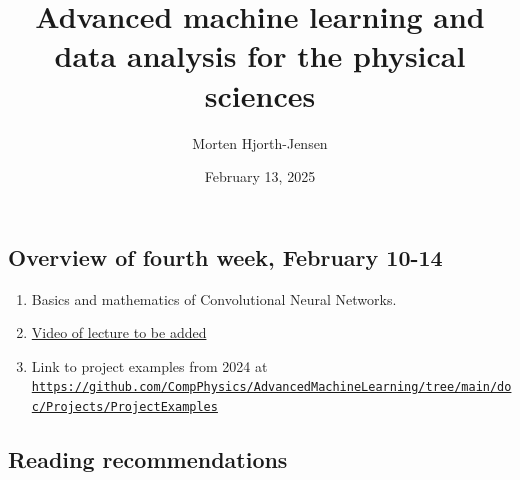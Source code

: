 \documentclass[%
oneside,                 %
final,                   %
10pt]{article}
\begin{document}

\newcommand{\exercisesection}[1]{\subsection*{#1}}






\title{Advanced machine learning and data analysis for the physical sciences}


\author{Morten Hjorth-Jensen}

\date{February 13, 2025
}

\subsection{Overview of fourth  week, February 10-14}

\begin{block}{}
\begin{enumerate}
\item Basics and mathematics of Convolutional  Neural Networks.

\item \href{{https://youtu.be/}}{Video of lecture to be added}

\item Link to project examples from 2024 at \href{{https://github.com/CompPhysics/AdvancedMachineLearning/tree/main/doc/Projects/ProjectExamples}}{\nolinkurl{https://github.com/CompPhysics/AdvancedMachineLearning/tree/main/doc/Projects/ProjectExamples}}
\end{enumerate}

\noindent
\end{block}

\subsection{Reading recommendations}
\end{document}
